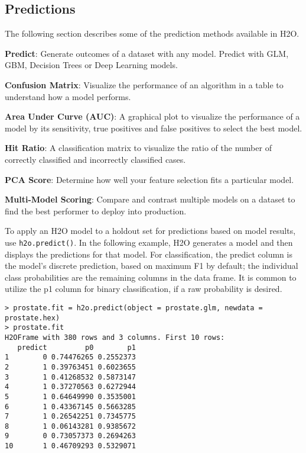 {{\subsection{Predictions}
\label{ssec:Predictions}

The following section describes some of the prediction methods available in H2O. 

{\textbf{Predict}}: Generate outcomes of a dataset with any model. Predict with GLM, GBM, Decision Trees or Deep Learning models.

{\textbf{Confusion Matrix}}: Visualize the performance of an algorithm in a table to understand how a model performs.

{\textbf{Area Under Curve (AUC)}}: A graphical plot to visualize the performance of a model by its sensitivity, true positives and false positives to select the best model.

{\textbf{Hit Ratio}}: A classification matrix to visualize the ratio of the number of correctly classified and incorrectly classified cases.

{\textbf{PCA Score}}: Determine how well your feature selection fits a particular model.

{\textbf{Multi-Model Scoring}}: Compare and contrast multiple models on a dataset to find the best performer to deploy into production. 


To apply an H2O model to a holdout set for predictions based on model results, use {\texttt{h2o.predict()}}.
In the following example, H2O generates a model and then displays the predictions for that model.
For classification, the predict column is the model's discrete prediction, based on maximum F1 by default; the individual class probabilities are the remaining columns in the data frame.
It is common to utilize the p1 column for binary classification, if a raw probability is desired.

\waterExampleInR
\medskip


\begin{lstlisting}[style=R]
> prostate.fit = h2o.predict(object = prostate.glm, newdata = prostate.hex)
> prostate.fit
H2OFrame with 380 rows and 3 columns. First 10 rows:
   predict         p0        p1
1        0 0.74476265 0.2552373
2        1 0.39763451 0.6023655
3        1 0.41268532 0.5873147
4        1 0.37270563 0.6272944
5        1 0.64649990 0.3535001
6        1 0.43367145 0.5663285
7        1 0.26542251 0.7345775
8        1 0.06143281 0.9385672
9        0 0.73057373 0.2694263
10       1 0.46709293 0.5329071
\end{lstlisting}

}}
